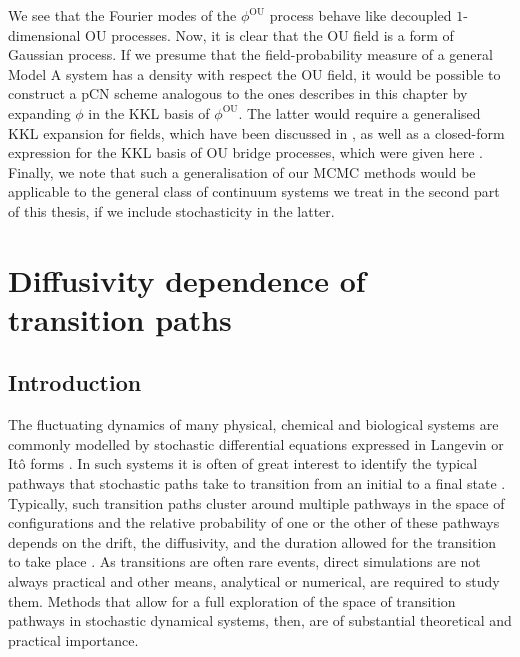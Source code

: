 We see that the Fourier modes of the $\phi^\text{OU}$ process behave like decoupled $1$-dimensional OU processes. Now, it is clear that the OU field is a form of Gaussian process. If we presume that the field-probability measure of a general Model A system has a density with respect the OU field, it would be possible to construct a pCN scheme analogous to the ones describes in this chapter by expanding $\phi$ in the KKL basis of $\phi^\text{OU}$. The latter would require a generalised KKL expansion for fields, which have been discussed in \citep{wangKarhunenLoeveExpansionsTheir2008}, as well as a closed-form expression for the KKL basis of OU bridge processes, which were given here \citep{corlayPropertiesOrnsteinUhlenbeckBridge2014a}. Finally, we note that such a generalisation of our MCMC methods would be applicable to the general class of continuum systems we treat in the second part of this thesis, if we include stochasticity in the latter.



\chapter{Diffusivity dependence of transition paths} \label{ch:Diffusivity dependence of transition paths}

\section{Introduction}


The fluctuating dynamics of many physical, chemical and biological
systems are commonly modelled by stochastic differential equations
expressed in Langevin or Itô forms \citep{kampenStochasticProcessesPhysics2011a, gardinerStochasticMethodsHandbook2010a, riskenFokkerPlanckEquationMethods2012a, bharucha-reidElementsTheoryMarkov2012a}.
In such systems it is often of great interest to identify the typical
pathways that stochastic paths take to transition from an initial
to a final state \citep{faccioliDominantPathwaysProtein2006a, demarcoPhaseTransitionModel2001a, gardnerConstructionGeneticToggle2000a, mangelBarrierTransitionsDriven1994a, wolynesNavigatingFoldingRoutes1995a, huangMolecularMathematicalBasis2012a, paninskiMostLikelyVoltage2006a, noltingBallsCupsQuasipotentials2016a, leeFindingMultipleReaction2017a}.  Typically, such transition paths cluster around multiple pathways
in the space of configurations and the relative probability of one
or the other of these pathways depends on the drift, the diffusivity,
and the duration allowed for the transition to take place \citep{onsagerFluctuationsIrreversibleProcesses1953a, bachFunctionalsPathsDiffusion1977a, itoProbabilisticConstructionLagrangean1978b, ikedaStochasticDifferentialEquations2014a}.
As transitions are often rare events, direct simulations are not always
practical and other means, analytical or numerical, are required to
study them. Methods that allow for a full exploration of the space
of transition pathways in stochastic dynamical systems, then, are
of substantial theoretical and practical importance.

